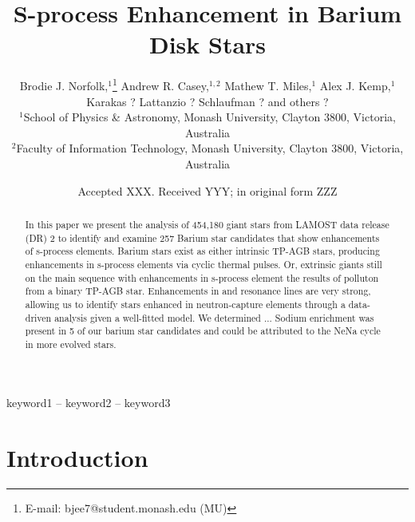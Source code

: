 \documentclass[a4paper,fleqn,usenatbib]{mnras}
\title[Barium Stars in the Disk]{S-process Enhancement in Barium Disk Stars}
\author[B. J. Norfolk et al.]{
Brodie J. Norfolk,$^{1}$\thanks{E-mail: bjee7@student.monash.edu (MU)}
Andrew R. Casey,$^{1,2}$
Mathew T. Miles,$^{1}$
Alex J. Kemp,$^{1}$ \newauthor
Karakas ? Lattanzio ? Schlaufman ? and others ?
\\
$^{1}$School of Physics \& Astronomy, Monash University, Clayton 3800, Victoria, Australia\\
$^{2}$Faculty of Information Technology, Monash University, Clayton 3800, Victoria, Australia\\
}
\date{Accepted XXX. Received YYY; in original form ZZZ}
\begin{document}
\label{firstpage}
\pagerange{\pageref{firstpage}--\pageref{lastpage}}
\maketitle

\begin{abstract}
In this paper we present the analysis of 454,180 giant stars from LAMOST data release (DR) 2 to identify and examine 257 Barium star candidates that show enhancements of s-process elements. Barium stars exist as either intrinsic TP-AGB stars, producing enhancements in s-process elements via cyclic thermal pulses. Or, extrinsic giants still on the main sequence with enhancements in s-process element the results of polluton from a binary TP-AGB star. Enhancements in  and  resonance lines are very strong, allowing us to identify stars enhanced in neutron-capture elements through a data-driven analysis given a well-fitted model. We determined ... Sodium enrichment was present in 5 of our barium star candidates and could be attributed to the NeNa cycle in more evolved stars.

\end{abstract}

\begin{keywords}
keyword1 -- keyword2 -- keyword3
\end{keywords}




\section{Introduction}
\end{document}
